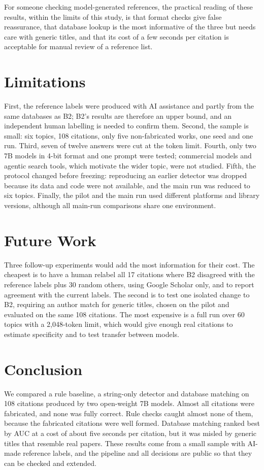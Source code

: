 \documentclass[10pt,twocolumn]{article}
\begin{document}
For someone checking model-generated references, the practical reading of these results, within the limits of this study, is that format checks give false reassurance, that database lookup is the most informative of the three but needs care with generic titles, and that its cost of a few seconds per citation is acceptable for manual review of a reference list.

\section{Limitations}
First, the reference labels were produced with AI assistance and partly from the same databases as B2; B2's results are therefore an upper bound, and an independent human labelling is needed to confirm them. Second, the sample is small: six topics, 108 citations, only five non-fabricated works, one seed and one run. Third, seven of twelve answers were cut at the token limit. Fourth, only two 7B models in 4-bit format and one prompt were tested; commercial models and agentic search tools, which motivate the wider topic, were not studied. Fifth, the protocol changed before freezing: reproducing an earlier detector was dropped because its data and code were not available, and the main run was reduced to six topics. Finally, the pilot and the main run used different platforms and library versions, although all main-run comparisons share one environment.

\section{Future Work}
Three follow-up experiments would add the most information for their cost. The cheapest is to have a human relabel all 17 citations where B2 disagreed with the reference labels plus 30 random others, using Google Scholar only, and to report agreement with the current labels. The second is to test one isolated change to B2, requiring an author match for generic titles, chosen on the pilot and evaluated on the same 108 citations. The most expensive is a full run over 60 topics with a 2,048-token limit, which would give enough real citations to estimate specificity and to test transfer between models.

\section{Conclusion}
We compared a rule baseline, a string-only detector and database matching on 108 citations produced by two open-weight 7B models. Almost all citations were fabricated, and none was fully correct. Rule checks caught almost none of them, because the fabricated citations were well formed. Database matching ranked best by AUC at a cost of about five seconds per citation, but it was misled by generic titles that resemble real papers. These results come from a small sample with AI-made reference labels, and the pipeline and all decisions are public so that they can be checked and extended.
\end{document}
